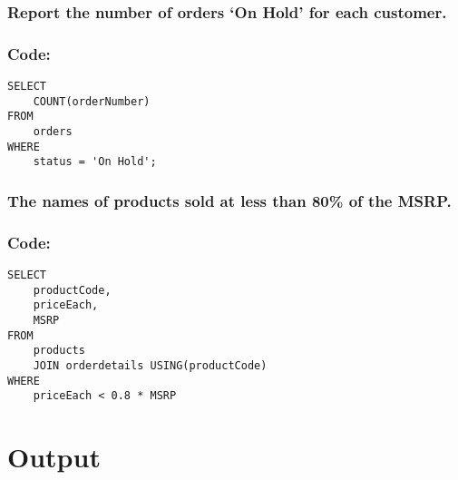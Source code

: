 \documentclass[12pt]{article}
\begin{document}
\vspace{5mm}
\subsubsection{Report the number of orders ‘On Hold’ for each customer.}
\subsubsection*{Code:}
\begin{verbatim}
SELECT
    COUNT(orderNumber)
FROM
    orders
WHERE
    status = 'On Hold';
\end{verbatim}

\vspace{5mm}
\subsubsection{The names of products sold at less than 80\% of the MSRP.}
\subsubsection*{Code:}
\begin{verbatim}
SELECT
    productCode,
    priceEach,
    MSRP
FROM
    products
    JOIN orderdetails USING(productCode)
WHERE
    priceEach < 0.8 * MSRP
\end{verbatim}
\pagebreak
\section{Output}

\end{document}
